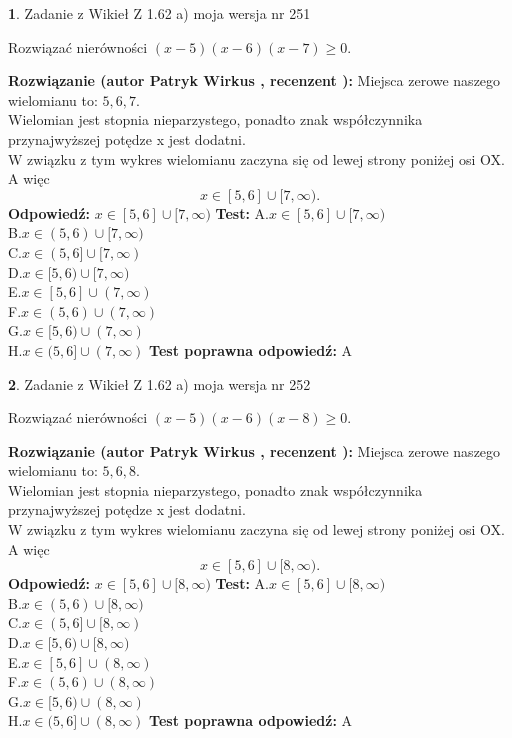 \documentclass[12pt, a4paper]{article}
\theoremstyle{definition} %
\newtheorem{zad}{}
\newcommand{\zadStart}[1]{\begin{zad}#1\newline}
\newcommand{\zadStop}{\end{zad}}
\newcommand{\rozwStart}[2]{\noindent \textbf{Rozwiązanie (autor #1 , recenzent #2): }\newline}
\newcommand{\rozwStop}{\newline}
\newcommand{\odpStart}{\noindent \textbf{Odpowiedź:}\newline}
\newcommand{\odpStop}{\newline}
\newcommand{\testStart}{\noindent \textbf{Test:}\newline}
\newcommand{\testStop}{\newline}
\newcommand{\kluczStart}{\noindent \textbf{Test poprawna odpowiedź:}\newline}
\newcommand{\kluczStop}{\newline}
\begin{document}
\zadStart{Zadanie z Wikieł Z 1.62 a) moja wersja nr 251}

Rozwiązać nierówności $(x-5)(x-6)(x-7)\ge0$.
\zadStop
\rozwStart{Patryk Wirkus}{}
Miejsca zerowe naszego wielomianu to: $5, 6, 7$.\\
Wielomian jest stopnia nieparzystego, ponadto znak współczynnika przy\linebreak najwyższej potędze x jest dodatni.\\ W związku z tym wykres wielomianu zaczyna się od lewej strony poniżej osi OX. A więc $$x \in [5,6] \cup [7,\infty).$$
\rozwStop
\odpStart
$x \in [5,6] \cup [7,\infty)$
\odpStop
\testStart
A.$x \in [5,6] \cup [7,\infty)$\\
B.$x \in (5,6) \cup [7,\infty)$\\
C.$x \in (5,6] \cup [7,\infty)$\\
D.$x \in [5,6) \cup [7,\infty)$\\
E.$x \in [5,6] \cup (7,\infty)$\\
F.$x \in (5,6) \cup (7,\infty)$\\
G.$x \in [5,6) \cup (7,\infty)$\\
H.$x \in (5,6] \cup (7,\infty)$
\testStop
\kluczStart
A
\kluczStop



\zadStart{Zadanie z Wikieł Z 1.62 a) moja wersja nr 252}

Rozwiązać nierówności $(x-5)(x-6)(x-8)\ge0$.
\zadStop
\rozwStart{Patryk Wirkus}{}
Miejsca zerowe naszego wielomianu to: $5, 6, 8$.\\
Wielomian jest stopnia nieparzystego, ponadto znak współczynnika przy\linebreak najwyższej potędze x jest dodatni.\\ W związku z tym wykres wielomianu zaczyna się od lewej strony poniżej osi OX. A więc $$x \in [5,6] \cup [8,\infty).$$
\rozwStop
\odpStart
$x \in [5,6] \cup [8,\infty)$
\odpStop
\testStart
A.$x \in [5,6] \cup [8,\infty)$\\
B.$x \in (5,6) \cup [8,\infty)$\\
C.$x \in (5,6] \cup [8,\infty)$\\
D.$x \in [5,6) \cup [8,\infty)$\\
E.$x \in [5,6] \cup (8,\infty)$\\
F.$x \in (5,6) \cup (8,\infty)$\\
G.$x \in [5,6) \cup (8,\infty)$\\
H.$x \in (5,6] \cup (8,\infty)$
\testStop
\kluczStart
A
\kluczStop
\end{document}
